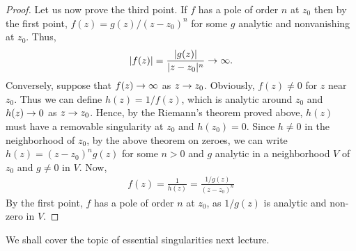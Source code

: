 \begin{proof}
    Let us now prove the third point. If $f$ has a pole of order $n$ at $z_0$ then by the first point, $f(z)=g(z)/(z-z_0)^n$ for some $g$ analytic and nonvanishing at $z_0$.
    Thus,
    \begin{align*}
        |f(z)|=\frac{|g(z)|}{|z-z_0|^n}\rightarrow \infty.
    \end{align*}
    Conversely, suppose that $f(z)\rightarrow\infty$ as $z\rightarrow z_0$. Obviously, $f(z)\neq 0$ for $z$ near $z_0$.  Thus we can define $h(z)=1/f(z)$, which is analytic around $z_0$ and
    $h(z)\rightarrow 0$ as $z\rightarrow z_0$. Hence, by the Riemann's theorem proved above, $h(z)$ must have a removable singularity at $z_0$ and $h(z_0)=0$. Since $h\neq 0$ in the neighborhood
    of $z_0$, by the above theorem on zeroes, we can write $h(z)=(z-z_0)^ng(z)$ for some $n>0$ and $g$ analytic in a neighborhood $V$ of $z_0$ and $g\neq 0$ in $V$. Now,
    \begin{align*}
        f(z)=\frac{1}{h(z)}=\frac{1/g(z)}{(z-z_0)^n}
    \end{align*}
    By the first point, $f$ has a pole of order $n$ at $z_0$, as $1/g(z)$ is analytic and non-zero in $V$.
\end{proof}

We shall cover the topic of essential singularities next lecture.
